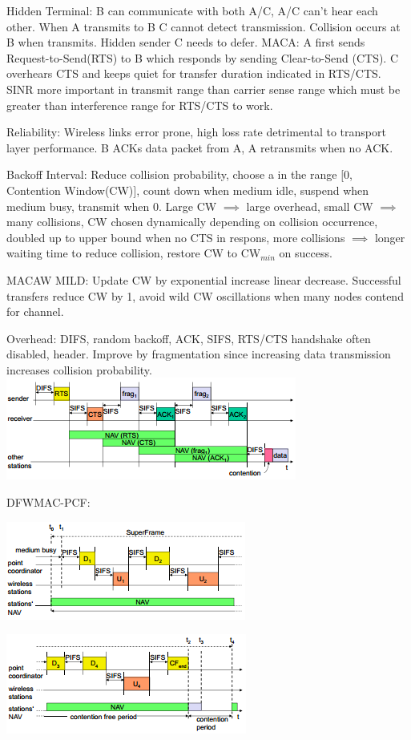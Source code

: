 \documentclass[9pt]{extarticle}
\begin{document}
\begin{multicols}{2}
Hidden Terminal: B can communicate with both A/C, A/C can't hear each other. When A transmits to B C cannot detect transmission. Collision occurs at B when transmits. Hidden sender C needs to defer. MACA: A first sends Request-to-Send(RTS) to B which responds by sending Clear-to-Send (CTS). C overhears CTS and keeps quiet for transfer duration indicated in RTS/CTS. SINR more important in transmit range than carrier sense range which must be greater than interference range for RTS/CTS to work.

Reliability: Wireless links error prone, high loss rate detrimental to transport layer performance. B ACKs data packet from A, A retransmits when no ACK.

Backoff Interval: Reduce collision probability, choose a in the range $[0$, Contention Window(CW)$]$, count down when medium idle, suspend when medium busy, transmit when 0. Large CW $\implies$ large overhead, small CW $\implies$  many collisions, CW chosen dynamically depending on collision occurrence, doubled up to upper bound when no CTS in respons, more collisions $\implies$ longer waiting time to reduce collision, restore CW to CW$_{min}$ on success.

MACAW MILD: Update CW by exponential increase linear decrease. Successful transfers reduce CW by 1, avoid wild CW oscillations when many nodes contend for channel. 

Overhead: DIFS, random backoff, ACK, SIFS, RTS/CTS handshake often disabled, header. Improve by fragmentation since increasing data transmission increases collision probability. \includegraphics{fragmentation.png}

DFWMAC-PCF: 

\includegraphics{dfwmac-pcf1.png}

\includegraphics{dfwmac-pcf2.png}


\end{multicols}
\end{document}
